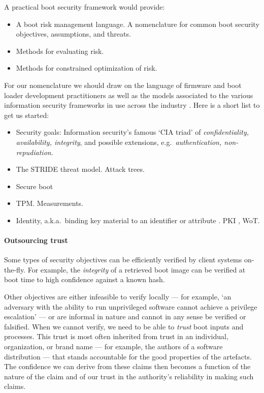 A practical boot security framework would provide:
\begin{itemize}
  \item A boot risk management language. A nomenclature for common boot security objectives, assumptions, and threats.
  \item Methods for evaluating risk.
  \item Methods for constrained optimization of risk.
\end{itemize}
For our nomenclature we should draw on the language of firmware and boot loader development practitioners \cite{yao2020building} as well as the models associated to the various information security frameworks in use across the industry \cite{taherdoost2022understanding}. 
%
Here is a short list to get us started:
\begin{itemize}
  \item Security goals: Information security's famous `CIA triad' of \emph{confidentiality, availability, integrity}, and possible extensions, e.g.~\emph{authentication, non-repudiation}.
  \item The STRIDE threat model. Attack trees.
  \item Secure boot
  \item TPM. Measurements.
  \item Identity, a.k.a.~binding key material to an identifier or attribute \cite{gerck1997overview}. PKI \cite{rfc5280}, WoT.
\end{itemize}

\paragraph{Outsourcing trust}
Some types of security objectives can be efficiently verified by client systems on-the-fly.
%
For example, the \emph{integrity} of a retrieved boot image can be verified at boot time to high confidence against a known hash.

Other objectives are either infeasible to verify locally --- for example, `an adversary with the ability to run unprivileged software cannot achieve a privilege escalation' --- or are informal in nature and cannot in any sense be verified or falsified.
%
When we cannot verify, we need to be able to \emph{trust} boot inputs and processes.
%
This trust is most often inherited from trust in an individual, organization, or brand name --- for example, the authors of a software distribution --- that stands accountable for the good properties of the artefacts.
%
The confidence we can derive from these claims then becomes a function of the nature of the claim and of our trust in the authority's reliability in making such claims.

